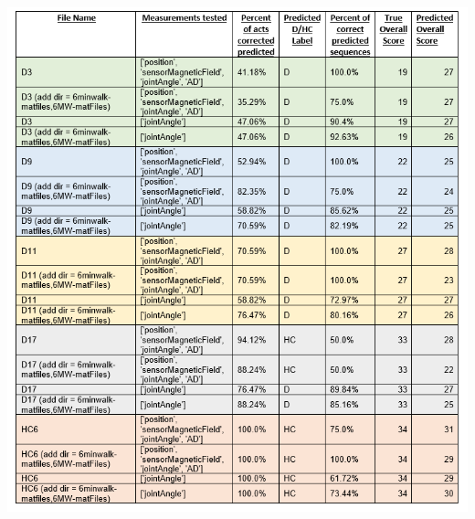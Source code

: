 \documentclass[12pt,twoside]{report}
\begin{document}
\begin{center}
\includegraphics[scale=0.7]{project_figures/fig11_20}
\end{center}
\end{document}
